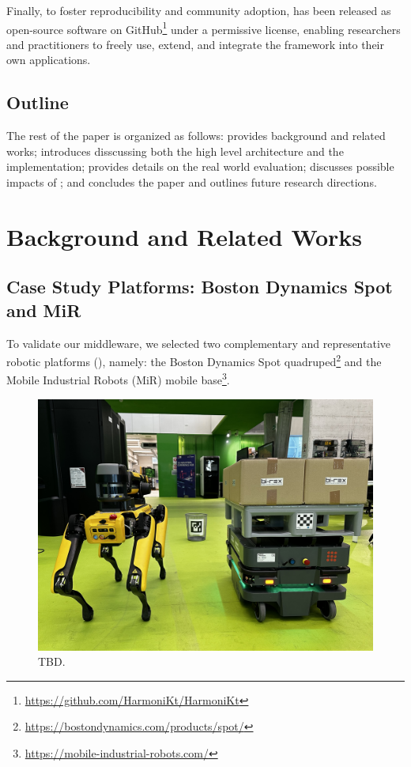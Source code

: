 \documentclass[conference]{IEEEtran}
\begin{document}
Finally, 
 to foster reproducibility and community adoption, 
  \approach{} has been released as open-source software 
  on GitHub\footnote{\url{https://github.com/HarmoniKt/HarmoniKt}} 
  under a permissive license, enabling researchers and practitioners to freely use, extend, 
  and integrate the framework into their own applications.

\subsection{Outline}
The rest of the paper is organized as follows:
  provides background and related works;
  introduces \approach{} disscussing both the high level architecture and the implementation;
  provides details on the real world evaluation;
  discusses possible impacts of \approach{};
 and  concludes the paper and outlines future research directions.

\section{Background and Related Works}\label{sec:related}

\subsection{Case Study Platforms: Boston Dynamics Spot and MiR}

To validate our middleware, 
 we selected two complementary and representative robotic platforms (), namely: 
 the Boston Dynamics Spot quadruped\footnote{\url{https://bostondynamics.com/products/spot/}}
 and the Mobile Industrial Robots (MiR) mobile base\footnote{\url{https://mobile-industrial-robots.com/}}.

\begin{figure}[htb]
    \centering
    \includegraphics[width=1\columnwidth]{images/robots.jpeg}
    \caption{
        TBD.
    }
    \label{fig:robots}
\end{figure}
\end{document}
